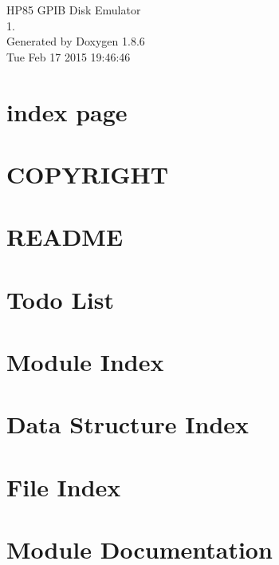 \documentclass[twoside]{book}
\newcommand{\clearemptydoublepage}{%
  \newpage{\pagestyle{empty}\cleardoublepage}%
}
\begin{document}
\hypersetup{pageanchor=false}
\begin{titlepage}
\vspace*{7cm}
\begin{center}%
{\Large H\-P85 G\-P\-I\-B Disk Emulator \\[1ex]\large 1. }\\
\vspace*{1cm}
{\large Generated by Doxygen 1.8.6}\\
\vspace*{0.5cm}
{\small Tue Feb 17 2015 19:46:46}\\
\end{center}
\end{titlepage}
\clearemptydoublepage
\tableofcontents
\clearemptydoublepage
{}
\hypersetup{pageanchor=true}

\chapter{index page}
\label{index}\hypertarget{index}{}
\chapter{C\-O\-P\-Y\-R\-I\-G\-H\-T}
\label{md_COPYRIGHT}
\hypertarget{md_COPYRIGHT}{}

\chapter{R\-E\-A\-D\-M\-E}
\label{md_README}
\hypertarget{md_README}{}

\chapter{Todo List}
\label{todo}
\hypertarget{todo}{}

\chapter{Module Index}

\chapter{Data Structure Index}

\chapter{File Index}

\chapter{Module Documentation}

\end{document}

